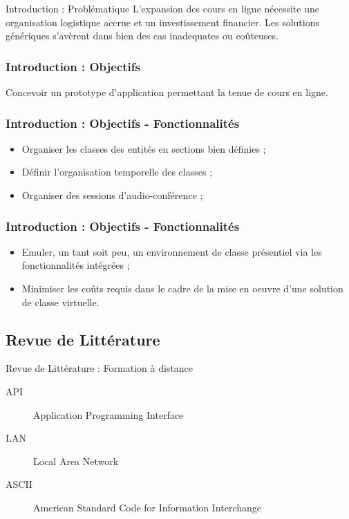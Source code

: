 \documentclass{beamer}
\begin{document}
\begin{frame}{Introduction : \small{Problématique}}
  L'expansion des cours en ligne nécessite une organisation logistique 
  accrue et un investissement financier. Les solutions génériques s'avèrent dans bien 
  des cas inadequates ou coûteuses.
\end{frame}


\begin{frame}
  \frametitle{Introduction : \small{Objectifs}}
    Concevoir un prototype d'application permettant la tenue de cours en ligne.
\end{frame}

\begin{frame}
  \frametitle{Introduction : \small{Objectifs} - \footnotesize{Fonctionnalités}}
  \begin{itemize}
    \item Organiser les classes des entités en sections bien définies ;
    \item Définir l'organisation temporelle des classes ;
    \item Organiser des sessions d’audio-conférence ;
\end{itemize}
\end{frame}

\begin{frame}
  \frametitle{Introduction : \small{Objectifs} - \footnotesize{Fonctionnalités}}
  \begin{itemize}
    \item Emuler, un tant soit peu, un environnement de classe présentiel via les fonctionnalités intégrées ;
    \item Minimiser les coûts requis dans le cadre de la mise en oeuvre d’une solution de classe virtuelle.
\end{itemize}
\end{frame}

\begin{frame}
  \begin{center}
    \section{\huge{Revue de Littérature}}
  \end{center}
\end{frame}

\begin{frame}{Revue de Littérature : \small{Formation à distance}}
  \begin{description}
    \item[API] Application Programming Interface
    \item[LAN] Local Area Network
    \item[ASCII] American Standard Code for Information Interchange
    \end{description}
\end{frame}
\end{document}
